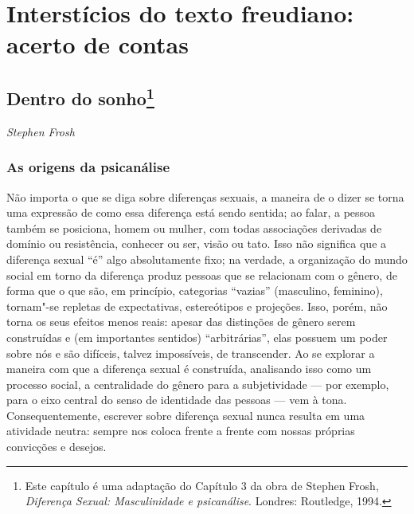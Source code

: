 \part{Interstícios do texto freudiano:\\ acerto de contas}

\chapter*{Dentro do sonho\footnote{Este capítulo é uma adaptação do
  Capítulo 3 da obra de Stephen Frosh, \emph{Diferença Sexual:
  Masculinidade e psicanálise}. Londres: Routledge, 1994.}}


\begin{flushright}
\emph{Stephen Frosh}
\end{flushright}

\section{As origens da psicanálise}

Não importa o que se diga sobre diferenças sexuais, a maneira de o dizer
se torna uma expressão de como essa diferença está sendo sentida; ao
falar, a pessoa também se posiciona, homem ou mulher, com todas
associações derivadas de domínio ou resistência, conhecer ou ser, visão
ou tato. Isso não significa que a diferença sexual ``é'' algo
absolutamente fixo; na verdade, a organização do mundo social em torno
da diferença produz pessoas que se relacionam com o gênero, de forma que
o que são, em princípio, categorias ``vazias'' (masculino, feminino),
tornam"-se repletas de expectativas, estereótipos e projeções. Isso,
porém, não torna os seus efeitos menos reais: apesar das distinções de
gênero serem construídas e (em importantes sentidos) ``arbitrárias'',
elas possuem um poder sobre nós e são difíceis, talvez impossíveis, de
transcender. Ao se explorar a maneira com que a diferença sexual é
construída, analisando isso como um processo social, a centralidade do
gênero para a subjetividade --- por exemplo, para o eixo central do senso
de identidade das pessoas --- vem à tona. Consequentemente, escrever
sobre diferença sexual nunca resulta em uma atividade neutra: sempre nos
coloca frente a frente com nossas próprias convicções e desejos.

